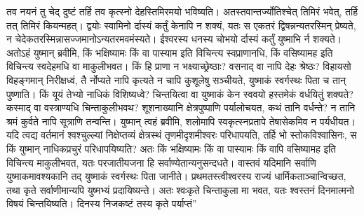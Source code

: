 \vakya तव नयनं तु चेद् दुष्टं तर्हि तव कृत्स्नो देहस्तिमिरमयो भविष्यति। अतस्तवान्तर्ज्योतिश्चेत् तिमिरं भवेत्, तर्हि तत् तिमिरं कियन्महत्।
\vakya द्वयोः स्वामिनो र्दास्यं कर्तुं केनापि न शक्यं, यतः स एकतरं द्विषन्नन्यतरस्मिन् प्रेष्यते, न चेदेकतरस्मिन्नासज्जमानोऽन्यतरमवमंस्यते। ईश्वरस्य धनस्य चोभयो र्दास्यं कर्तुं युष्माभि र्न शक्यते।
\vakya अतोऽहं युष्मान् ब्रवीमि, किं भक्षिष्यामः किं वा पास्याम इति विचिन्त्य स्वप्राणानधि, किं वसिष्यामह इति विचिन्त्य स्वदेहमधि वा माकुलीभवत। किं हि प्राणा न भक्ष्याच्छ्रेष्ठाः? वसनाद् वा नापि देहः श्रेष्ठः?
\vakya विहायसो विहङ्गमान् निरीक्षध्वं, तै र्नोप्यते नापि कृत्यते न चापि कुशूलेषु सञ्चीयते, युष्माकं स्वर्गस्थः पिता च तान् पुष्णाति। किं यूयं तेभ्यो नाधिकं विशिष्यध्वे?
\vakya चिन्तयित्वा वा युष्माकं केन स्ववयो हस्तमेकं वर्धयितुं शक्यते?
\vakya कस्माद् वा वस्त्राण्यधि चिन्ताकुलीभवथ? शूशनाख्यानि क्षेत्रपुष्पाणि पर्यालोचयत, कथं तानि वर्धन्ते?
\vakya न तानि श्रमं कुर्वते नापि सूत्राणि तन्वन्ति। युष्मान् त्वहं ब्रवीमि, शलोमापि स्वकृत्स्नप्रतापे तेषासेकमिव न पर्यधीयत।
\vakya यदि त्वद्य वर्तमानं श्वश्चुल्ल्यां निक्षेप्तव्यं क्षेत्रस्थं तृणमीदृशमीश्वरः परिधापयति, तर्हि भो स्तोकविश्वासिनः, स किं युष्मान् नाधिकप्रचुरं परिधापयिष्यति?
\vakya अतः किं भक्षिष्यामः किं वा पास्यामः किं वापि वसिष्यामह इति विचिन्त्य माकुलीभवत, यतः परजातीयजना हि सर्वाण्येतान्यनुसन्दधते।
\vakya वास्तवं यदिमानि सर्वाणि युष्माकमावश्यकानि तद् युष्माकं स्वर्गस्थः पिता जानीते।
\vakya प्रथमतस्त्वीश्वरस्य राज्यं धार्मिकताञ्चान्विच्छत, तथा कृते सर्वाणीमान्यपि युष्मभ्यं प्रदायिष्यन्ते।
\vakya अतः श्वःकृते चिन्ताकुला मा भवत, यतः श्वस्तनं दिनमात्मनो विषयं चिन्तयिष्यति। दिनस्य निजकष्टं तस्य कृते पर्याप्तं”\eoc